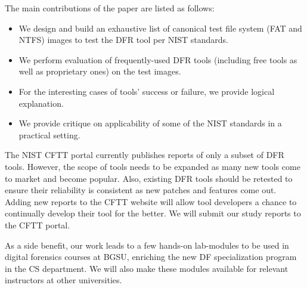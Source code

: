 The main contributions of the paper are listed as follows:
\begin{itemize}
\item We design and build an exhaustive list of canonical test file system (FAT and NTFS) images to test the DFR tool per NIST standards. 
\item We perform evaluation of frequently-used DFR tools (including free tools as well as proprietary ones) on the test images.
\item For the interesting cases of tools' success or failure, we provide logical explanation.
\item We provide critique on applicability of some of the NIST standards in a practical setting. 
\end{itemize}


The NIST CFTT portal currently publishes reports of only a subset of DFR tools. 
However, the scope of tools needs to be expanded as many new tools come to market and become popular.
Also, existing DFR tools should be retested to ensure their reliability is consistent 
as new patches and features come out. 
Adding new reports to the CFTT website will allow tool developers a 
chance to continually develop their tool for the better. We will submit our study reports to the CFTT portal.

As a side benefit, our work leads to a few hands-on lab-modules to be used in digital forensics courses 
at BGSU, enriching the new DF specialization program in the CS department. We will also make these modules
available for relevant instructors at other universities.
